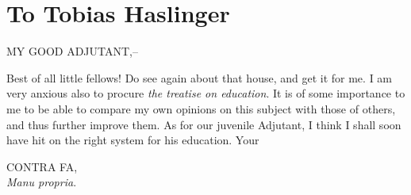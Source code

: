 \documentclass[12pt,oneside]{book}
\begin{document}
\section{To Tobias Haslinger}
MY GOOD ADJUTANT,-- \par 
\vspace{12pt}
Best of all little fellows! Do see again about that house, and get it for me. I am very anxious also to procure \textit{the treatise on education}.
It is of some importance to me to be able to compare my own opinions on this subject with those of others, and thus further improve them. As for our
juvenile Adjutant, I think I shall soon have hit on the right system for his education. Your \par 
\vspace{12pt}
\begin{flushright}
    CONTRA FA, \\
    \textit{Manu propria}.
\end{flushright}
\end{document}
